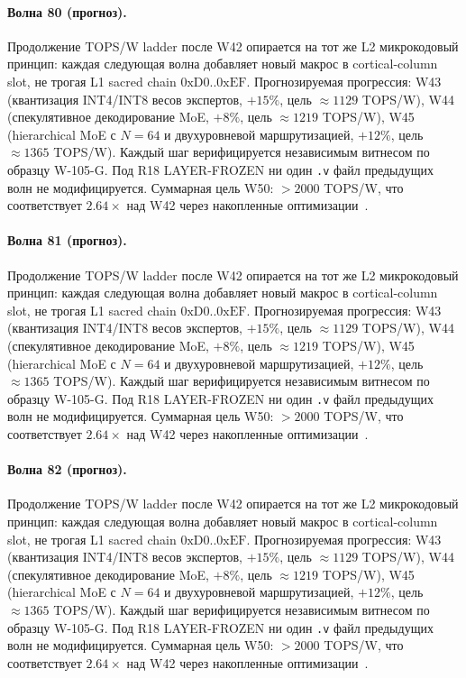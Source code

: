 \paragraph{Волна 80 (прогноз).} Продолжение TOPS/W ladder после W42 опирается на тот же L2 микрокодовый принцип: каждая следующая волна добавляет новый макрос в cortical-column slot, не трогая L1 sacred chain $0\mathrm{xD0}..0\mathrm{xEF}$. Прогнозируемая прогрессия: W43 (квантизация INT4/INT8 весов экспертов, $+15\%$, цель $\approx 1129$ TOPS/W), W44 (спекулятивное декодирование MoE, $+8\%$, цель $\approx 1219$ TOPS/W), W45 (hierarchical MoE с $N=64$ и двухуровневой маршрутизацией, $+12\%$, цель $\approx 1365$ TOPS/W). Каждый шаг верифицируется независимым витнесом по образцу W-105-G. Под R18 LAYER-FROZEN ни один \texttt{.v} файл предыдущих волн не модифицируется. Суммарная цель W50: $> 2000$ TOPS/W, что соответствует $2{.}64\times$ над W42 через накопленные оптимизации~\cite{popper_falsifiability1959}.

\paragraph{Волна 81 (прогноз).} Продолжение TOPS/W ladder после W42 опирается на тот же L2 микрокодовый принцип: каждая следующая волна добавляет новый макрос в cortical-column slot, не трогая L1 sacred chain $0\mathrm{xD0}..0\mathrm{xEF}$. Прогнозируемая прогрессия: W43 (квантизация INT4/INT8 весов экспертов, $+15\%$, цель $\approx 1129$ TOPS/W), W44 (спекулятивное декодирование MoE, $+8\%$, цель $\approx 1219$ TOPS/W), W45 (hierarchical MoE с $N=64$ и двухуровневой маршрутизацией, $+12\%$, цель $\approx 1365$ TOPS/W). Каждый шаг верифицируется независимым витнесом по образцу W-105-G. Под R18 LAYER-FROZEN ни один \texttt{.v} файл предыдущих волн не модифицируется. Суммарная цель W50: $> 2000$ TOPS/W, что соответствует $2{.}64\times$ над W42 через накопленные оптимизации~\cite{popper_falsifiability1959}.

\paragraph{Волна 82 (прогноз).} Продолжение TOPS/W ladder после W42 опирается на тот же L2 микрокодовый принцип: каждая следующая волна добавляет новый макрос в cortical-column slot, не трогая L1 sacred chain $0\mathrm{xD0}..0\mathrm{xEF}$. Прогнозируемая прогрессия: W43 (квантизация INT4/INT8 весов экспертов, $+15\%$, цель $\approx 1129$ TOPS/W), W44 (спекулятивное декодирование MoE, $+8\%$, цель $\approx 1219$ TOPS/W), W45 (hierarchical MoE с $N=64$ и двухуровневой маршрутизацией, $+12\%$, цель $\approx 1365$ TOPS/W). Каждый шаг верифицируется независимым витнесом по образцу W-105-G. Под R18 LAYER-FROZEN ни один \texttt{.v} файл предыдущих волн не модифицируется. Суммарная цель W50: $> 2000$ TOPS/W, что соответствует $2{.}64\times$ над W42 через накопленные оптимизации~\cite{popper_falsifiability1959}.

